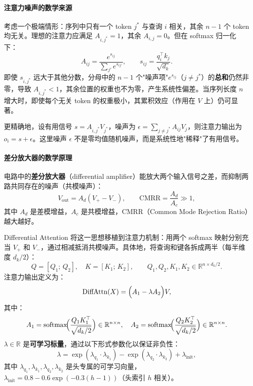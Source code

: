 \documentclass[12pt,a4paper]{article}
\begin{document}
\paragraph{注意力噪声的数学来源}

考虑一个极端情形：序列中只有一个 token $j^*$ 与查询 $i$ 相关，其余 $n-1$ 个 token 均无关。理想的注意力应满足 $A_{i,j^*} = 1$，其余 $A_{i,j} = 0$。但在 softmax 归一化下：
\begin{equation}
A_{ij} = \frac{e^{s_{ij}}}{\sum_{j'} e^{s_{ij'}}},\qquad s_{ij} = \frac{q_i^\top k_j}{\sqrt{d_k}}.
\end{equation}
即使 $s_{i,j^*}$ 远大于其他分数，分母中的 $n-1$ 个"噪声项"$e^{s_{ij}}$（$j \ne j^*$）的\textbf{总和}仍然非零，导致 $A_{i,j^*} < 1$，其余位置的权重也不为零，产生系统性偏差。当序列长度 $n$ 增大时，即使每个无关 token 的权重极小，其累积效应（作用在 $V$ 上）仍可显著。

更精确地，设有用信号 $s = A_{i,j^*} V_{j^*}$，噪声为 $\epsilon = \sum_{j \ne j^*} A_{ij} V_j$，则注意力输出为 $o_i = s + \epsilon$。这里噪声 $\epsilon$ 不是零均值随机噪声，而是系统性地"稀释"了有用信号。

\paragraph{差分放大器的数学原理}

电路中的\textbf{差分放大器}（differential amplifier）能放大两个输入信号之差，而抑制两路共同存在的噪声（共模噪声）：
\begin{equation}
V_{\text{out}} = A_d (V_+ - V_-),\qquad \text{CMRR} = \frac{A_d}{A_c} \gg 1,
\end{equation}
其中 $A_d$ 是差模增益，$A_c$ 是共模增益，CMRR（Common Mode Rejection Ratio）越大越好。

Differential Attention 将这一思想移植到注意力机制：用两个 softmax 映射分别充当 $V_+$ 和 $V_-$，通过相减抵消共模噪声。具体地，将查询和键各拆成两半（每半维度 $d_k/2$）：
\begin{equation}
Q = [Q_1;\, Q_2],\quad K = [K_1;\, K_2],\qquad Q_1, Q_2, K_1, K_2 \in \mathbb{R}^{n \times d_k/2}.
\end{equation}
注意力输出定义为：
\begin{equation}
\text{DiffAttn}(X) = \Bigl(A_1 - \lambda A_2\Bigr) V,
\end{equation}
其中：
\begin{equation}
A_1 = \text{softmax}\!\Bigl(\frac{Q_1 K_1^\top}{\sqrt{d_k/2}}\Bigr) \in \mathbb{R}^{n\times n},\quad
A_2 = \text{softmax}\!\Bigl(\frac{Q_2 K_2^\top}{\sqrt{d_k/2}}\Bigr) \in \mathbb{R}^{n\times n}.
\end{equation}
$\lambda \in \mathbb{R}$ 是\textbf{可学习标量}，通过以下形式参数化以保证非负性：
\begin{equation}
\lambda = \exp(\lambda_{q_1} \cdot \lambda_{k_1}) - \exp(\lambda_{q_2} \cdot \lambda_{k_2}) + \lambda_{\text{init}},
\end{equation}
其中 $\lambda_{q_1}, \lambda_{k_1}, \lambda_{q_2}, \lambda_{k_2}$ 是头专属的可学习向量，$\lambda_{\text{init}} = 0.8 - 0.6 \exp(-0.3(h-1))$（头索引 $h$ 相关）。
\end{document}
